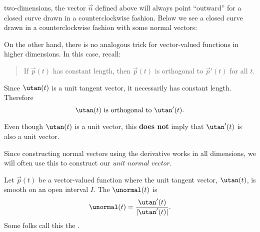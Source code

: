 \documentclass{ximera}
\begin{document}
two-dimensions, the vector $\vec{n}$ defined above will always point
``outward'' for a closed curve drawn in a counterclockwise
fashion. Below we see a closed curve drawn in a counterclockwise
fashion with some normal vectors:
\begin{image}
\end{image}
On the other hand, there is no analogous trick for vector-valued
functions in higher dimensions. In this case, recall:
\begin{quote}
If $\vec{p}(t)$ has constant length, then $\vec{p}(t)$ is orthogonal
to $\vec{p}'(t)$ for all $t$.
\end{quote}
Since $\utan(t)$ is a unit tangent vector, it necessarily has
constant length. Therefore
\[
\utan(t)\text{ is orthogonal to }\utan'(t).
\]
\begin{warning}
  Even though $\utan(t)$ is a unit vector, this \textbf{does not}
  imply that $\utan'(t)$ is also a unit vector.
\end{warning}
Since constructing normal vectors using the derivative works in all
dimensions, we will often use this to construct our \textit{unit
  normal vector}.
\begin{definition}
Let $\vec{p}(t)$ be a vector-valued function where the unit tangent
vector, $\utan(t)$, is smooth on an open interval $I$. The
 $\unormal(t)$ is 
\[
\unormal(t) = \frac{\utan'(t)}{|\utan'(t)|}.
\]
Some folks call this the .
\end{definition}
\end{document}
